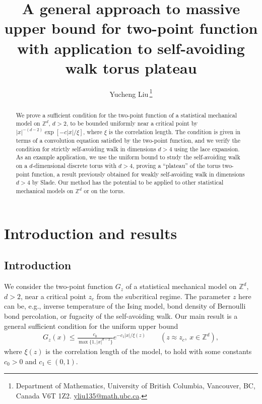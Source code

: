\documentclass[11pt,hidelinks]{article}
\title{A general approach to massive upper bound for two-point function with application to self-avoiding walk torus plateau}
\author{
Yucheng Liu\,\orcidlink{0000-0002-1917-8330}\thanks{Department of Mathematics,
	University of British Columbia,
	Vancouver, BC, Canada V6T 1Z2.
	\href{mailto:yliu135@math.ubc.ca}{yliu135@math.ubc.ca}.
	}
}
\date{\vspace{-5ex}} %
\theoremstyle{plain}
\numberwithin{equation}{section}
\newcommand{\eg}{e.g.}
\newcommand{\Z}{\mathbb{Z}}
\renewcommand{\(}{\left(}
\renewcommand{\)}{\right)}
\newcommand{\1}{\mathds{1}}
\providecommand{\abs}[1]{\lvert#1\rvert}
\begin{document}
\maketitle


\begin{abstract}
We prove a sufficient condition for the two-point function of a statistical mechanical model on $\mathbb{Z}^d$, $d > 2$, to be 
bounded uniformly near a critical point by $|x|^{-(d-2)} \exp [ -c|x| / \xi ]$, where $\xi$ is the correlation length.
The condition is given in terms of a convolution equation satisfied by the two-point function, and we verify the condition for strictly self-avoiding walk in dimensions $d > 4$ using the lace expansion. 
As an example application, 
we use the uniform bound to study the self-avoiding walk on a $d$-dimensional discrete torus with $d > 4$, proving a ``plateau'' of the torus two-point function, a result previously obtained for weakly self-avoiding walk in dimensions $d > 4$ by Slade. 
Our method has the potential to be applied to other statistical mechanical models on $\mathbb{Z}^d$ or on the torus. 
\end{abstract}








\section{Introduction and results}

\subsection{Introduction}
We consider the two-point function $G_z$ of a statistical mechanical model on $\Z^d$, $d > 2$, near a critical point $z_c$ from the subcritical regime. The parameter $z$ here can be, \eg, inverse temperature of the Ising model, bond density of Bernoulli bond percolation, or fugacity of the self-avoiding walk. 
Our main result is a general sufficient condition for the uniform upper bound
\begin{align}
\label{eq:scaling_ub}
G_z(x) \le \frac{ c_0 } { \max \{ 1,  \abs x^{d-2} \} } e^{-c_1 \abs x / \xi(z)}
	\qquad (z\approx z_c,\ x\in \Z^d),
\end{align}
where $\xi(z)$ is the correlation length of the model,
to hold with some constants $c_0 > 0$ and $c_1 \in (0,1)$. 
\end{document}
